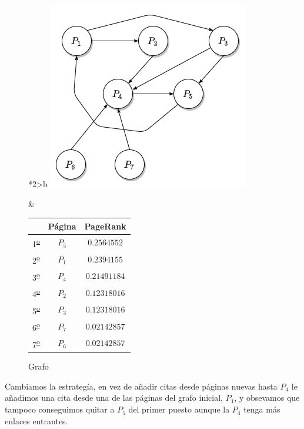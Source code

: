 \documentclass[size=a4, parskip=half, titlepage=false, toc=flat, toc=bib, 12pt]{scrartcl}
\theoremstyle{theorem-style}
\theoremstyle{definition-style}
\theoremstyle{remark-style}
\theoremstyle{example-style}
\theoremstyle{definition-style}
\theoremstyle{remark-style}
\begin{document}
\begin{figure}[!ht]
  \begin{tabular}{*{2}{>{\centering\arraybackslash}b{}}}
  \centering
    \includegraphics[scale=0.5]{./img/grafoej2}
    \caption{Grafo}
    &
      \renewcommand{\arraystretch}{1.3}
      \begin{tabular}{ccc}
        & Página & PageRank     \\ \hline
      1\textsuperscript{\underline{o}}} & $P_5$  & $0.2564552$  \\ \hline
      2\textsuperscript{\underline{o}}} & $P_1$  & $0.2394155$  \\ \hline
      3\textsuperscript{\underline{o}}} & $P_4$  & $0.21491184$ \\ \hline
      4\textsuperscript{\underline{o}}} & $P_2$  & $0.12318016$ \\ \hline
      5\textsuperscript{\underline{o}}} & $P_3$  & $0.12318016$ \\ \hline
      6\textsuperscript{\underline{o}}} & $P_7$  & $0.02142857$ \\ \hline
      7\textsuperscript{\underline{o}}} & $P_6$  & $0.02142857$ \\ \hline
      \end{tabular}
    \end{tabular}
\end{figure}

\newpage

Cambiamos la estrategía, en vez de añadir citas desde páginas nuevas hasta $P_4$ le añadimos una cita desde una de las páginas del grafo inicial, $P_1$, y obsevamos que tampoco conseguimos quitar a $P_5$ del primer puesto aunque la $P_4$ tenga más enlaces entrantes.
\end{document}

